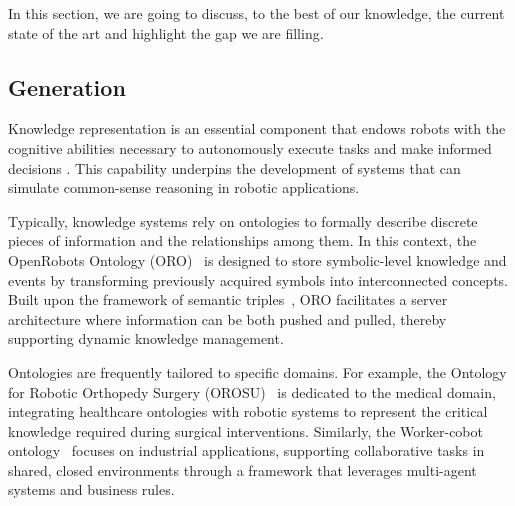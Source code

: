 In this section, we are going to discuss, to the best of our knowledge, the current state of the art and highlight the gap we are filling. 

\subsection{\Kbase Generation}

Knowledge representation is an essential component that endows robots with the cognitive abilities necessary to autonomously execute tasks and make informed decisions \cite{bayat2016requirements,kbSurvey}. This capability underpins the development of systems that can simulate common-sense reasoning in robotic applications.

Typically, knowledge systems rely on ontologies to formally describe discrete pieces of information and the relationships among them. In this context, the OpenRobots Ontology (ORO)~\cite{ORO} is designed to store symbolic-level knowledge and events by transforming previously acquired symbols into interconnected concepts. Built upon the framework of semantic triples~\cite{RDF}, ORO facilitates a server architecture where information can be both pushed and pulled, thereby supporting dynamic knowledge management.

Ontologies are frequently tailored to specific domains. For example, the Ontology for Robotic Orthopedy Surgery (OROSU)~\cite{OROSU} is dedicated to the medical domain, integrating healthcare ontologies with robotic systems to represent the critical knowledge required during surgical interventions. Similarly, the Worker-cobot ontology~\cite{workerCobot} focuses on industrial applications, supporting collaborative tasks in shared, closed environments through a framework that leverages multi-agent systems and business rules.

